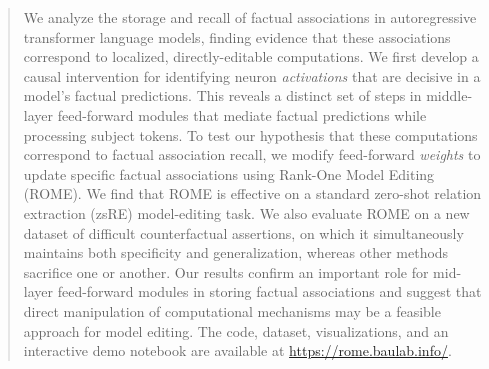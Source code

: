\begin{abstract}
We analyze the storage and recall of factual associations in autoregressive transformer language models, finding evidence that these associations correspond to localized, directly-editable computations. We first develop a causal intervention for identifying neuron \textit{activations} that are decisive in a model's factual predictions. This reveals a distinct set of steps in middle-layer feed-forward modules that mediate factual predictions while processing subject tokens. To test our hypothesis that these computations correspond to factual association recall, we modify feed-forward \textit{weights} to update specific factual associations using Rank-One Model Editing (ROME).  We find that ROME is effective on a standard zero-shot relation extraction (zsRE) model-editing task. We also evaluate ROME on a new dataset of difficult counterfactual assertions, on which it simultaneously maintains both specificity and generalization, whereas other methods sacrifice one or another. Our results confirm an important role for mid-layer feed-forward modules in storing factual associations and suggest that direct manipulation of computational mechanisms may be a feasible approach for model editing. The code, dataset, visualizations, and an interactive demo notebook are available
at \url{https://rome.baulab.info/}.


\end{abstract}